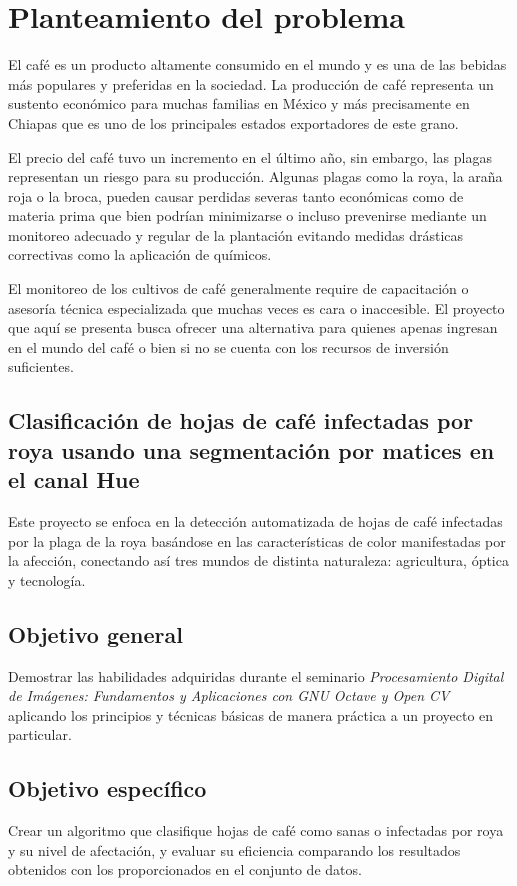 \chapter{Planteamiento del problema}
El café es un producto altamente consumido en el mundo y es una de las bebidas más populares y preferidas en la sociedad. La producción de café representa un sustento económico para muchas familias en México y más precisamente en Chiapas que es uno de los principales estados exportadores de este grano.

El precio del café tuvo un incremento en el último año, sin embargo, las plagas representan un riesgo para su producción. Algunas plagas como la roya, la araña roja o la broca, pueden causar perdidas severas tanto económicas como de materia prima que bien podrían minimizarse o incluso prevenirse mediante un monitoreo adecuado y regular de la plantación evitando medidas drásticas correctivas como la aplicación de químicos.

El monitoreo de los cultivos de café generalmente require de capacitación o asesoría técnica especializada que muchas veces es cara o inaccesible. El proyecto que aquí se presenta busca ofrecer una alternativa para quienes apenas ingresan en el mundo del café o bien si no se cuenta con los recursos de inversión suficientes.

\section{Clasificación de hojas de café infectadas por roya usando una segmentación por matices en el canal Hue}
Este proyecto se enfoca en la detección automatizada de hojas de café infectadas por la plaga de la roya basándose en las características de color manifestadas por la afección, conectando así tres mundos de distinta naturaleza: agricultura, óptica y tecnología.

\section{Objetivo general}
Demostrar las habilidades adquiridas durante el seminario \textit{Procesamiento Digital de Imágenes: Fundamentos y Aplicaciones con GNU Octave y Open CV} aplicando los principios y técnicas básicas de manera práctica a un proyecto en particular.

\section{Objetivo específico}
Crear un algoritmo que clasifique hojas de café como sanas o infectadas por roya y su nivel de afectación, y evaluar su eficiencia comparando los resultados obtenidos con los proporcionados en el conjunto de datos.

